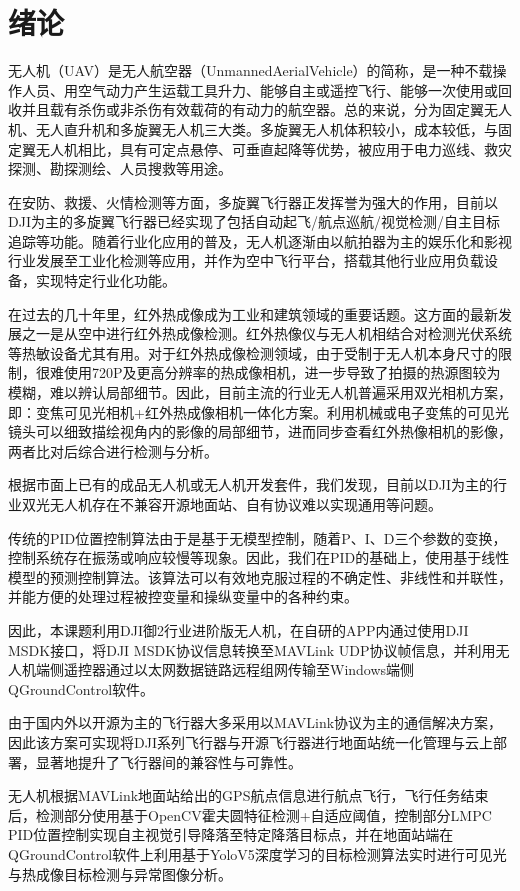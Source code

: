 \chapter{绪论}

无人机（UAV）是无人航空器（UnmannedAerialVehicle）的简称，是一种不载操作人员、用空气动力产生运载工具升力、能够自主或遥控飞行、能够一次使用或回收并且载有杀伤或非杀伤有效载荷的有动力的航空器。总的来说，分为固定翼无人机、无人直升机和多旋翼无人机三大类。多旋翼无人机体积较小，成本较低，与固定翼无人机相比，具有可定点悬停、可垂直起降等优势，被应用于电力巡线、救灾探测、勘探测绘、人员搜救等用途。

在安防、救援、火情检测等方面，多旋翼飞行器正发挥誉为强大的作用，目前以DJI为主的多旋翼飞行器已经实现了包括自动起飞/航点巡航/视觉检测/自主目标追踪等功能。随着行业化应用的普及，无人机逐渐由以航拍器为主的娱乐化和影视行业发展至工业化检测等应用，并作为空中飞行平台，搭载其他行业应用负载设备，实现特定行业化功能。

在过去的几十年里，红外热成像成为工业和建筑领域的重要话题。这方面的最新发展之一是从空中进行红外热成像检测。红外热像仪与无人机相结合对检测光伏系统等热敏设备尤其有用。对于红外热成像检测领域，由于受制于无人机本身尺寸的限制，很难使用720P及更高分辨率的热成像相机，进一步导致了拍摄的热源图较为模糊，难以辨认局部细节。因此，目前主流的行业无人机普遍采用双光相机方案，即：变焦可见光相机+红外热成像相机一体化方案。利用机械或电子变焦的可见光镜头可以细致描绘视角内的影像的局部细节，进而同步查看红外热像相机的影像，两者比对后综合进行检测与分析。

根据市面上已有的成品无人机或无人机开发套件，我们发现，目前以DJI为主的行业双光无人机存在不兼容开源地面站、自有协议难以实现通用等问题。

传统的PID位置控制算法由于是基于无模型控制，随着P、I、D三个参数的变换，控制系统存在振荡或响应较慢等现象。因此，我们在PID的基础上，使用基于线性模型的预测控制算法。该算法可以有效地克服过程的不确定性、非线性和并联性，并能方便的处理过程被控变量和操纵变量中的各种约束。

因此，本课题利用DJI御2行业进阶版无人机，在自研的APP内通过使用DJI MSDK接口，将DJI MSDK协议信息转换至MAVLink UDP协议帧信息，并利用无人机端侧遥控器通过以太网数据链路远程组网传输至Windows端侧QGroundControl软件。

由于国内外以开源为主的飞行器大多采用以MAVLink协议为主的通信解决方案，因此该方案可实现将DJI系列飞行器与开源飞行器进行地面站统一化管理与云上部署，显著地提升了飞行器间的兼容性与可靠性。

无人机根据MAVLink地面站给出的GPS航点信息进行航点飞行，飞行任务结束后，检测部分使用基于OpenCV霍夫圆特征检测+自适应阈值，控制部分LMPC PID位置控制实现自主视觉引导降落至特定降落目标点，并在地面站端在QGroundControl软件上利用基于YoloV5深度学习的目标检测算法实时进行可见光与热成像目标检测与异常图像分析。

